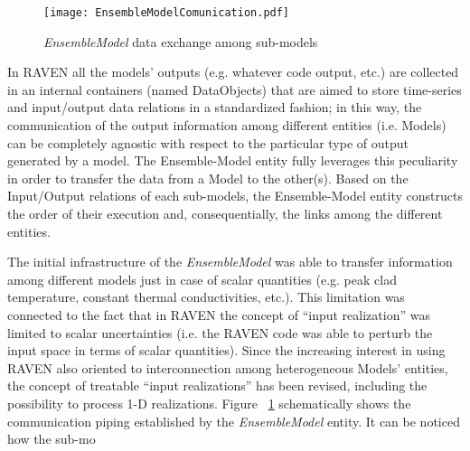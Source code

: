 \begin{figure}
    \centering
    \texttt{[image: EnsembleModelComunication.pdf]}
    \caption{\textit{EnsembleModel} data exchange among sub-models}
    \label{fig:ensembleModelComunication}
\end{figure}

In RAVEN all the models’ outputs (e.g. whatever code output, etc.) are collected in an 
internal containers
(named DataObjects) that are aimed to store time-series and input/output data relations 
in a standardized
fashion; in this way, the communication of the output information among different 
entities (i.e. Models) can be
completely agnostic with respect to the particular type of output generated by a model. 
The Ensemble-Model
entity fully leverages this peculiarity in order to transfer the data from a Model to the 
other(s). 
Based on the Input/Output relations of each sub-models, the Ensemble-Model entity 
constructs the order of
their execution and, consequentially, the links among the different entities. 


The initial infrastructure of the \textit{EnsembleModel}  was able to 
transfer information
among different models just in case of scalar quantities (e.g. peak clad temperature, 
constant thermal
conductivities, etc.). This limitation was connected to the fact that in RAVEN the 
concept of ``input realization''
was limited to scalar uncertainties (i.e. the RAVEN code was able to perturb the input 
space in terms of scalar
quantities). Since the increasing interest in using RAVEN also oriented to 
interconnection among heterogeneous
Models’ entities, the concept of treatable “input realizations” has been revised, including 
the possibility to
process 1-D realizations.
Figure ~\ref{fig:ensembleModelComunication} schematically shows the communication 
piping established by the 
\textit{EnsembleModel} entity. It can be noticed how the sub-mo